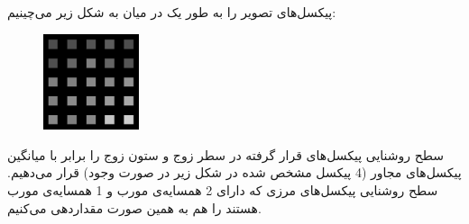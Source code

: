 \documentclass{article}
\begin{document}
\subsection{}
\begin{latin}

\end{latin}


\section{}%
پیکسل‌های تصویر را به طور یک در میان به شکل زیر می‌چینیم:
\begin{figure}[H]
    \centering
    \includegraphics[width=0.25\textwidth]{figures/5a.jpg}
    \caption
	{}
    \label{fig:fig1}
\end{figure}
سطح روشنایی پیکسل‌های قرار گرفته در سطر زوج و ستون زوج را برابر با میانگین پیکسل‌های مجاور (4 پیکسل مشخص شده در شکل زیر در صورت وجود) قرار می‌دهیم. سطح روشنایی پیکسل‌های مرزی که دارای 2 همسایه‌ی مورب و 1 همسایه‌ی مورب هستند را هم به همین صورت مقداردهی می‌کنیم.
\end{document}
